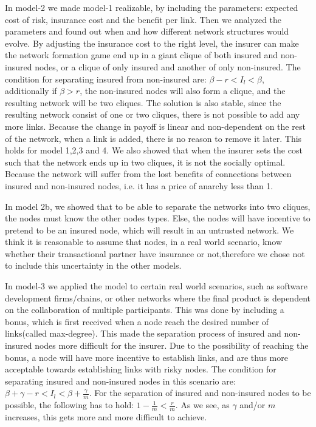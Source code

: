 In model-2 we made model-1 realizable, by including the parameters: expected cost of risk, insurance cost and the benefit per link. Then we analyzed the parameters and found out when and how different network structures would evolve. By adjusting the insurance cost to the right level, the insurer can make the network formation game end up in a giant clique of both insured and non-insured nodes, or a clique of only insured and another of only non-insured. The condition for separating insured from non-insured are: $\beta-r<I_{l}<\beta$, additionally if $\beta>r$, the non-insured nodes will also form a clique, and the resulting network will be two cliques. The solution is also stable, since the resulting network consist of one or two cliques, there is not possible to add any more links. Because the change in payoff is linear and non-dependent on the rest of the network, when a link is added, there is no reason to remove it later. This holds for model 1,2,3 and 4.
We also showed that when the insurer sets the cost such that the network ends up in two cliques, it is not the socially optimal. Because the network will suffer from the lost benefits of connections between insured and non-insured nodes, i.e. it has a price of anarchy less than 1.

In model 2b, we showed that to be able to separate the networks into two cliques, the nodes must know the other nodes types. Else, the nodes will have incentive to pretend to be an insured node, which will result in an untrusted network. We think it is reasonable to assume that nodes, in a real world scenario, know whether their transactional partner have insurance or not,therefore we chose not to include this uncertainty in the other models.

In model-3 we applied the model to certain real world scenarios, such as software development firms/chains, or other networks where the final product is dependent on the collaboration of multiple participants.
This was done by including a bonus, which is first received when a node reach the desired number of links(called max-degree). This made the separation process of insured and non-insured nodes more difficult for the insurer. Due to the possibility of reaching the bonus, a node will have more incentive to establish links, and are thus more acceptable towards establishing links with risky nodes. The condition for separating insured and non-insured nodes in this scenario are: $\beta+\gamma-r<I_{l}<\beta+\frac{\gamma}{m}$. For the separation of insured and non-insured nodes to be possible, the following has to hold: $1-\frac{1}{m}<\frac{r}{m}$. As we see, as $\gamma$ and/or $m$ increases, this gets more and more difficult to achieve. 

